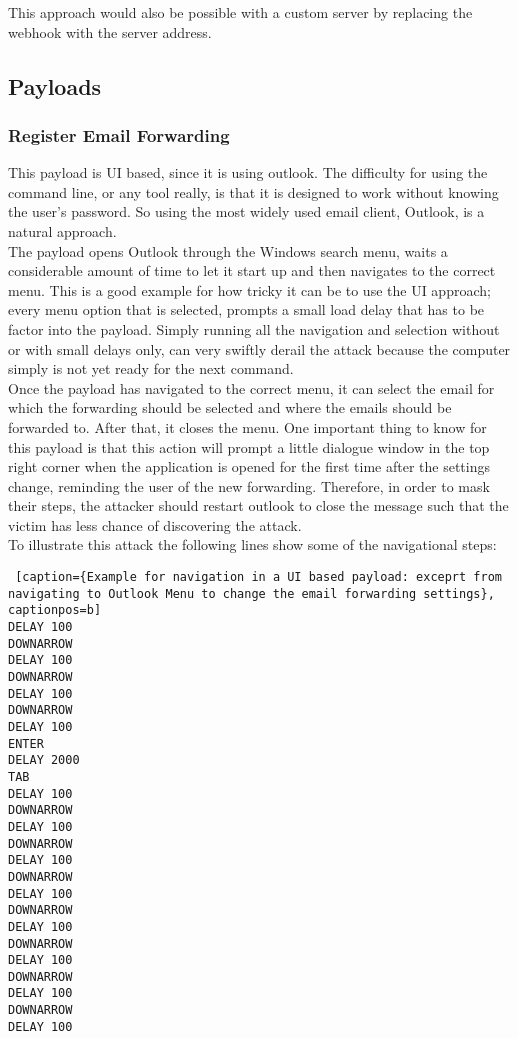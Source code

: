This approach would also be possible with a custom server by replacing the webhook with the server address.



\subsection{Payloads}

\subsubsection{Register Email Forwarding}

This payload is UI based, since it is using outlook. The difficulty for using the command line, or any tool really, is that it is designed to work without knowing the user's password. So using the most widely used email client, Outlook, is a natural approach. \\
The payload opens Outlook through the Windows search menu, waits a considerable amount of time to let it start up and then navigates to the correct menu. This is a good example for how tricky it can be to use the UI approach; every menu option that is selected, prompts a small load delay that has to be factor into the payload. Simply running all the navigation and selection without or with small delays only, can very swiftly derail the attack because the computer simply is not yet ready for the next command. \\
Once the payload has navigated to the correct menu, it can select the email for which the forwarding should be selected and where the emails should be forwarded to. After that, it closes the menu. One important thing to know for this payload is that this action will prompt a little dialogue window in the top right corner when the application is opened for the first time after the settings change, reminding the user of the new forwarding. Therefore, in order to mask their steps, the attacker should restart outlook to close the message such that the victim has less chance of discovering the attack. \\
To illustrate this attack the following lines show some of the navigational steps:


\begin{lstlisting} [caption={Example for navigation in a UI based payload: exceprt from navigating to Outlook Menu to change the email forwarding settings}, captionpos=b]
DELAY 100
DOWNARROW
DELAY 100
DOWNARROW
DELAY 100
DOWNARROW
DELAY 100
ENTER
DELAY 2000
TAB
DELAY 100
DOWNARROW
DELAY 100
DOWNARROW
DELAY 100
DOWNARROW
DELAY 100
DOWNARROW
DELAY 100
DOWNARROW
DELAY 100
DOWNARROW
DELAY 100
DOWNARROW
DELAY 100
\end{lstlisting}

